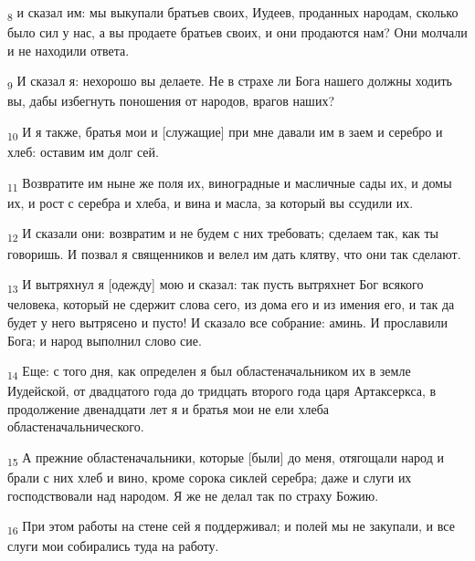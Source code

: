 \begin{tcolorbox}
\textsubscript{8} и сказал им: мы выкупали братьев своих, Иудеев, проданных народам, сколько было сил у нас, а вы продаете братьев своих, и они продаются нам? Они молчали и не находили ответа.
\end{tcolorbox}
\begin{tcolorbox}
\textsubscript{9} И сказал я: нехорошо вы делаете. Не в страхе ли Бога нашего должны ходить вы, дабы избегнуть поношения от народов, врагов наших?
\end{tcolorbox}
\begin{tcolorbox}
\textsubscript{10} И я также, братья мои и [служащие] при мне давали им в заем и серебро и хлеб: оставим им долг сей.
\end{tcolorbox}
\begin{tcolorbox}
\textsubscript{11} Возвратите им ныне же поля их, виноградные и масличные сады их, и домы их, и рост с серебра и хлеба, и вина и масла, за который вы ссудили их.
\end{tcolorbox}
\begin{tcolorbox}
\textsubscript{12} И сказали они: возвратим и не будем с них требовать; сделаем так, как ты говоришь. И позвал я священников и велел им дать клятву, что они так сделают.
\end{tcolorbox}
\begin{tcolorbox}
\textsubscript{13} И вытряхнул я [одежду] мою и сказал: так пусть вытряхнет Бог всякого человека, который не сдержит слова сего, из дома его и из имения его, и так да будет у него вытрясено и пусто! И сказало все собрание: аминь. И прославили Бога; и народ выполнил слово сие.
\end{tcolorbox}
\begin{tcolorbox}
\textsubscript{14} Еще: с того дня, как определен я был областеначальником их в земле Иудейской, от двадцатого года до тридцать второго года царя Артаксеркса, в продолжение двенадцати лет я и братья мои не ели хлеба областеначальнического.
\end{tcolorbox}
\begin{tcolorbox}
\textsubscript{15} А прежние областеначальники, которые [были] до меня, отягощали народ и брали с них хлеб и вино, кроме сорока сиклей серебра; даже и слуги их господствовали над народом. Я же не делал так по страху Божию.
\end{tcolorbox}
\begin{tcolorbox}
\textsubscript{16} При этом работы на стене сей я поддерживал; и полей мы не закупали, и все слуги мои собирались туда на работу.
\end{tcolorbox}
